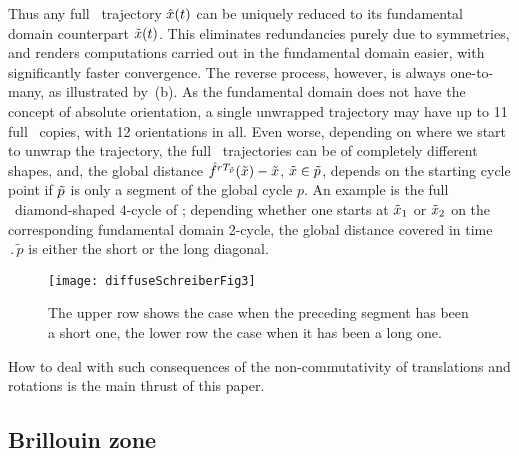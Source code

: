 Thus any full \statesp\ trajectory $\hat x(t)$ can be uniquely reduced to
its fundamental domain counterpart $\tilde x(t)$. This eliminates redundancies
purely due to symmetries, and renders computations carried out in the
fundamental domain easier, with significantly faster convergence. The
reverse process, however, is always one-to-many, as illustrated by
\,(b).
As the fundamental domain does not have
the concept of absolute orientation, a single unwrapped trajectory may
have up to 11 full \statesp\ copies, with 12 orientations in all. Even worse,
depending on where we start to unwrap the trajectory, the full \statesp\
trajectories can be of completely different shapes, and, the global distance
$ \hat f^{r {T_{\tilde{p}}}} (\tilde x{}) - \tilde x{} $,
$\tilde x{} \in {\tilde p}$,
depends on the starting cycle point if
${\tilde p}$ is only a segment of the global cycle $p$. An
example is the full \statesp\ diamond-shaped 4-cycle of ; %
depending whether one starts at $\tilde x_1$ or $\tilde x_2$ on the
corresponding fundamental domain 2-cycle, the global
distance covered in time $\period{\tilde{p}}$ is either the short or the
long diagonal.

\begin{figure}
\begin{center}
\texttt{[image: diffuseSchreiberFig3]}
\end{center}
\caption{
The upper row shows the case when the preceding
segment has been a short one,
the lower row the case when it has been a long one.
    }
\label{schreiberFig3}
\end{figure}


How to deal with such consequences of the non-commutativity of
translations and rotations is the main thrust of this paper.

        \ifboyscout
\subsection{Brillouin zone}

